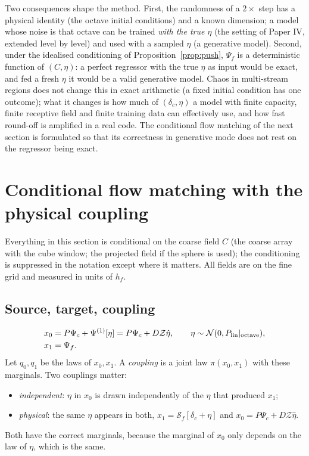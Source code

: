 \documentclass[11pt]{article}
\theoremstyle{definition}
\newcommand{\Psic}{\Psi_{c}}
\newcommand{\Psif}{\Psi_{f}}
\newcommand{\lin}{{\rm lin}}
\newcommand{\Zel}{\mathcal{Z}}
\newcommand{\Nbody}{\mathcal{S}}
\begin{document}
Two consequences shape the method. First, the randomness of a $2\times$ step has a physical identity (the octave initial conditions) and a known dimension; a model whose noise is that octave can be trained \emph{with the true $\eta$} (the setting of Paper IV, extended level by level) and used with a sampled $\eta$ (a generative model). Second, under the idealised conditioning of Proposition~\ref{prop:push}, $\Psif$ is a deterministic function of $(C,\eta)$: a perfect regressor with the true $\eta$ as input would be exact, and fed a fresh $\eta$ it would be a valid generative model. Chaos in multi-stream regions does not change this in exact arithmetic (a fixed initial condition has one outcome); what it changes is how much of $(\delta_c,\eta)$ a model with finite capacity, finite receptive field and finite training data can effectively use, and how fast round-off is amplified in a real code. The conditional flow matching of the next section is formulated so that its correctness in generative mode does not rest on the regressor being exact.

\section{Conditional flow matching with the physical coupling}\label{sec:fm}

Everything in this section is conditional on the coarse field $C$ (the coarse array with the cube window; the projected field if the sphere is used); the conditioning is suppressed in the notation except where it matters. All fields are on the fine grid and measured in units of $h_f$.

\subsection{Source, target, coupling}

\begin{align}
x_0&=P\Psic+\Psi^{(1)}[\eta]=P\Psic+D\Zel\hat\eta,\qquad \eta\sim\mathcal N(0,P_\lin|_{\rm octave}),\label{eq:x0}\\
x_1&=\Psif .
\end{align}
Let $q_0,q_1$ be the laws of $x_0,x_1$. A \emph{coupling} is a joint law $\pi(x_0,x_1)$ with these marginals. Two couplings matter:
\begin{itemize}
\item[] \emph{independent}: $\eta$ in $x_0$ is drawn independently of the $\eta$ that produced $x_1$;
\item[] \emph{physical}: the same $\eta$ appears in both, $x_1=\Nbody_f[\delta_c+\eta]$ and $x_0=P\Psic+D\Zel\hat\eta$.
\end{itemize}
Both have the correct marginals, because the marginal of $x_0$ only depends on the law of $\eta$, which is the same.
\end{document}
